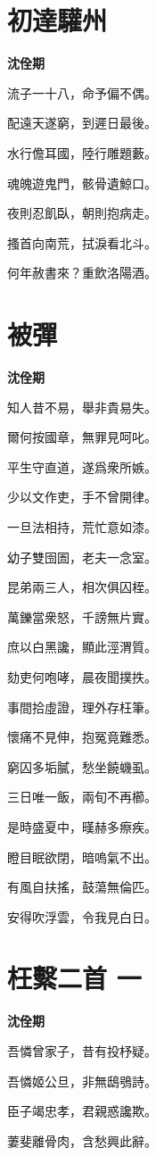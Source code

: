 \documentclass[12pt,a4paper]{ctexbook}
\begin{document}
\section{初達驩州}
\textbf{沈佺期}\par\vspace{0.5em}
流子一十八，命予偏不偶。\par
配遠天遂窮，到遲日最後。\par
水行儋耳國，陸行雕題藪。\par
魂魄遊鬼門，骸骨遺鯨口。\par
夜則忍飢臥，朝則抱病走。\par
搔首向南荒，拭淚看北斗。\par
何年赦書來？重飲洛陽酒。\par

\section{被彈}
\textbf{沈佺期}\par\vspace{0.5em}
知人昔不易，舉非貴易失。\par
爾何按國章，無罪見呵叱。\par
平生守直道，遂爲衆所嫉。\par
少以文作吏，手不曾開律。\par
一旦法相持，荒忙意如漆。\par
幼子雙囹圄，老夫一念室。\par
昆弟兩三人，相次俱囚桎。\par
萬鑠當衆怒，千謗無片實。\par
庶以白黑讒，顯此涇渭質。\par
劾吏何咆哮，晨夜聞撲抶。\par
事間拾虛證，理外存枉筆。\par
懷痛不見伸，抱冤竟難悉。\par
窮囚多垢膩，愁坐饒蟣虱。\par
三日唯一飯，兩旬不再櫛。\par
是時盛夏中，暵赫多瘵疾。\par
瞪目眠欲閉，暗嗚氣不出。\par
有風自扶搖，鼓蕩無倫匹。\par
安得吹浮雲，令我見白日。\par

\section{枉繫二首 一}
\textbf{沈佺期}\par\vspace{0.5em}
吾憐曾家子，昔有投杼疑。\par
吾憐姬公旦，非無鴟鴞詩。\par
臣子竭忠孝，君親惑讒欺。\par
萋斐離骨肉，含愁興此辭。\par
\end{document}
